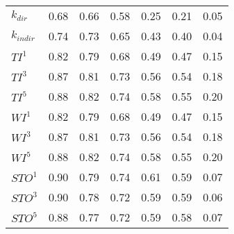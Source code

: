 \documentclass[onecolumn]{article} %
\begin{document}
\begin{table}[ht]
\begin{tabular}{lllllll}
\(\displaystyle k_{dir} \) &   {\color[HTML]{00D768} 0.68} & {\color[HTML]{EF2A00} 0.66} & {\color[HTML]{0051D7} 0.58} & {\color{orange} 0.25} & {\color[HTML]{6200D7} 0.21} & {\color[HTML]{9B9B9B} 0.05} \\
\(\displaystyle k_{indir} \) &   {\color[HTML]{EF2A00} 0.74} & {\color[HTML]{00D768} 0.73} & {\color[HTML]{0051D7} 0.65} & {\color[HTML]{6200D7} 0.43} & {\color{orange} 0.40} & {\color[HTML]{9B9B9B} 0.04} \\
\(\displaystyle TI^1 \) &   {\color[HTML]{EF2A00} 0.82} & {\color[HTML]{00D768} 0.79} & {\color[HTML]{0051D7} 0.68} & {\color[HTML]{6200D7} 0.49} & {\color{orange} 0.47} & {\color[HTML]{9B9B9B} 0.15} \\
\(\displaystyle TI^3 \) &   {\color[HTML]{EF2A00} 0.87} & {\color[HTML]{00D768} 0.81} & {\color[HTML]{0051D7} 0.73} & {\color{orange} 0.56} & {\color[HTML]{6200D7} 0.54} & {\color[HTML]{9B9B9B} 0.18} \\
\(\displaystyle TI^5 \) &   {\color[HTML]{EF2A00} 0.88} & {\color[HTML]{00D768} 0.82} & {\color[HTML]{0051D7} 0.74} & {\color{orange} 0.58} & {\color[HTML]{6200D7} 0.55} & {\color[HTML]{9B9B9B} 0.20} \\
\(\displaystyle WI^1 \) &   {\color[HTML]{EF2A00} 0.82} & {\color[HTML]{00D768} 0.79} & {\color[HTML]{0051D7} 0.68} & {\color[HTML]{6200D7} 0.49} & {\color{orange} 0.47} & {\color[HTML]{9B9B9B} 0.15} \\
\(\displaystyle WI^3 \) &   {\color[HTML]{EF2A00} 0.87} & {\color[HTML]{00D768} 0.81} & {\color[HTML]{0051D7} 0.73} & {\color{orange} 0.56} & {\color[HTML]{6200D7} 0.54} & {\color[HTML]{9B9B9B} 0.18} \\
\(\displaystyle WI^5 \) &   {\color[HTML]{EF2A00} 0.88} & {\color[HTML]{00D768} 0.82} & {\color[HTML]{0051D7} 0.74} & {\color{orange} 0.58} & {\color[HTML]{6200D7} 0.55} & {\color[HTML]{9B9B9B} 0.20} \\
\(\displaystyle STO^1 \) &   {\color[HTML]{00D768} 0.90} & {\color[HTML]{EF2A00} 0.79} & {\color[HTML]{0051D7} 0.74} & {\color{orange} 0.61} & {\color[HTML]{6200D7} 0.59} & {\color[HTML]{9B9B9B} 0.07} \\
\(\displaystyle STO^3 \) &   {\color[HTML]{00D768} 0.90} & {\color[HTML]{EF2A00} 0.78} & {\color[HTML]{0051D7} 0.72} & {\color{orange} 0.59} & {\color[HTML]{6200D7} 0.59} & {\color[HTML]{9B9B9B} 0.06} \\
\(\displaystyle STO^5 \) &   {\color[HTML]{00D768} 0.88} & {\color[HTML]{EF2A00} 0.77} & {\color[HTML]{0051D7} 0.72} & {\color[HTML]{6200D7} 0.59} & {\color{orange} 0.58} & {\color[HTML]{9B9B9B} 0.07} \\

\end{tabular}
\end{table}
\end{document}

